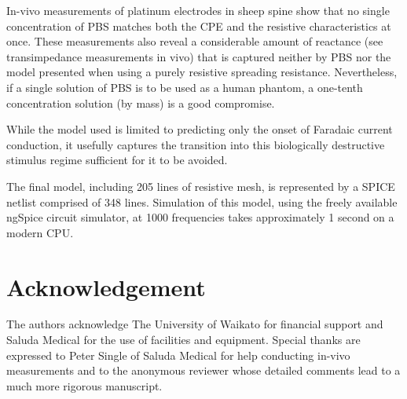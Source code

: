 \documentclass[journal, a4paper]{IEEEtran}
\begin{document}
In-vivo measurements of platinum electrodes in sheep spine show that no single concentration of PBS matches both the CPE and the resistive characteristics at once. {\color{blue} These measurements also reveal a considerable amount of reactance (see transimpedance measurements in vivo) that is captured neither by PBS nor the model presented when using a purely resistive spreading resistance.} Nevertheless, {\color{blue}if a single solution of PBS is to be used as a human phantom, a one-tenth concentration solution (by mass)} is a good compromise.

{
    \color{blue}
    While the model used is limited to predicting only the onset of Faradaic current conduction, it usefully captures the transition into this biologically destructive stimulus regime sufficient for it to be avoided. 
    
    {\color{blue}The final model, including 205 lines of resistive mesh, is represented by a SPICE netlist comprised of 348 lines. Simulation of this model, using the freely available ngSpice circuit simulator, at 1000 frequencies takes approximately 1 second on a modern CPU.} 
}

\section*{Acknowledgement}
The authors acknowledge The University of Waikato for financial support and Saluda Medical for the use of facilities and equipment. {\color{blue}Special thanks are expressed to Peter Single of Saluda Medical for help conducting in-vivo measurements and to the anonymous reviewer whose detailed comments lead to a much more rigorous manuscript.}
\end{document}
